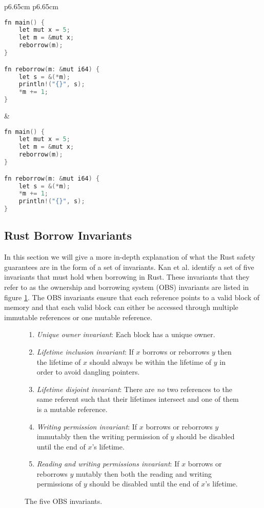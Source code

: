 \noindent
\begin{tabular}{p{6.65cm} p{6.65cm}}
    \begin{lstlisting}[language=C,frame=single,caption=Reborrow Example,label=code:reborrow_semantics]
fn main() {
    let mut x = 5;
    let m = &mut x;
    reborrow(m);
}

fn reborrow(m: &mut i64) {
    let s = &(*m);
    println!("{}", s);
    *m += 1;
}
    \end{lstlisting}

    &

    \begin{lstlisting}[language=C,frame=single,caption=Wrong Example,label=code:reborrow_semantics_wrong]
fn main() {
    let mut x = 5;
    let m = &mut x;
    reborrow(m);
}

fn reborrow(m: &mut i64) {
    let s = &(*m);
    *m += 1;
    println!("{}", s);
}
    \end{lstlisting}
\end{tabular}

\subsection{Rust Borrow Invariants}
\label{sec:obsinvariants}
In this section we will give a more in-depth explanation of what the Rust safety guarantees are in the form of a set of invariants.
Kan et al. \cite{Kan2018AnEO} identify a set of five invariants that must hold when borrowing in Rust. These invariants that they refer to as the ownership and borrowing system (OBS) invariants are listed in figure \ref{fig:obsinvariants}. The OBS invariants ensure that each reference points to a valid block of memory and that each valid block can either be accessed through multiple immutable references or one mutable reference.

\begin{figure}[h]
\centering
\begin{enumerate}
    \item \textit{Unique owner invariant}: Each block has a unique owner.
    \item \textit{Lifetime inclusion invariant}: If $x$ borrows or reborrows $y$ then the lifetime of $x$ should always be within the lifetime of $y$ in order to avoid dangling pointers.
    \item \textit{Lifetime disjoint invariant}: There are \textit{no} two references to the same referent such that their lifetimes intersect and one of them is a mutable reference.
    \item \textit{Writing permission invariant}: If $x$ borrows or reborrows $y$ immutably then the writing permission of $y$ should be disabled until the end of $x$'s lifetime.
    \item \textit{Reading and writing permissions invariant}: If $x$ borrows or reborrows $y$ mutably then both the reading and writing permissions of $y$ should be disabled until the end of $x$'s lifetime.
\end{enumerate}
\caption{The five OBS invariants.\cite{Kan2018AnEO}}
\label{fig:obsinvariants}
\end{figure}

